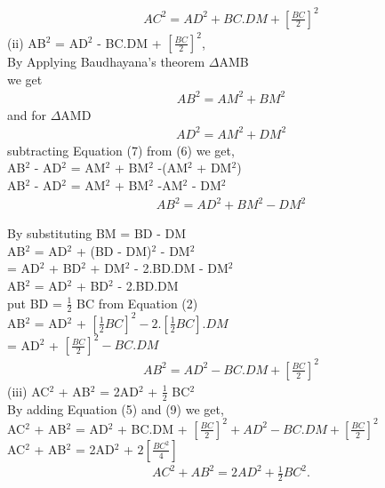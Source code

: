 \begin{frame}
\begin{align}
AC^2 = AD^2 + BC.DM + \left[\frac{BC}{2}\right]^2
\end{align}
(ii) AB$^2$ = AD$^2$ - BC.DM + $\left[\frac{BC}{2}\right]^2$,\\
By Applying Baudhayana's theorem $\Delta$AMB \\
we get 
\begin{align}
AB^2 = AM^2 + BM^2
\end{align}
and for $\Delta$AMD 
\begin{align}
AD^2 = AM^2 + DM^2
\end{align}
subtracting Equation (7) from (6) we get,\\
AB$^2$ - AD$^2$ = AM$^2$ + BM$^2$ -(AM$^2$ + DM$^2$)\\
AB$^2$ - AD$^2$ = AM$^2$ + BM$^2$ -AM$^2$ - DM$^2$
\begin{align}
AB^2 = AD^2 + BM^2 - DM^2
\end{align}
\end{frame}
\begin{frame}
By substituting BM = BD - DM\\ \enspace
AB$^2$ = AD$^2$ + (BD - DM)$^2$ - DM$^2$\\\enspace
= AD$^2$ + BD$^2$ + DM$^2$ - 2.BD.DM - DM$^2$\\
AB$^2$ = AD$^2$ + BD$^2$ - 2.BD.DM\\
put BD = $\frac{1}{2}$ BC from Equation (2)\\
AB$^2$ = AD$^2$ + $\left[\frac{1}{2} BC\right]^2 - 2.\left[\frac{1}{2} BC\right].DM$\\\enspace
= AD$^2$ + $\left[\frac{BC}{2}\right]^2 - BC.DM$
\begin{align}
AB^2 = AD^2 - BC.DM + \left[\frac{BC}{2}\right]^2
\end{align}
(iii) AC$^2$ + AB$^2$ = 2AD$^2$ + $\frac{1}{2}$ BC$^2$\\
By adding Equation (5) and (9) we get,\\
AC$^2$ + AB$^2$ = AD$^2$ + BC.DM + $\left[\frac{BC}{2}\right]^2 + AD^2 - BC.DM + \left[\frac{BC}{2}\right]^2$ \\
AC$^2$ + AB$^2$ = 2AD$^2$ + $2\left[\frac{BC^2}{4}\right]$
\begin{align}
AC^2 + AB^2 = 2AD^2 + \frac{1}{2} BC^2.
\end{align}
\end{frame}
